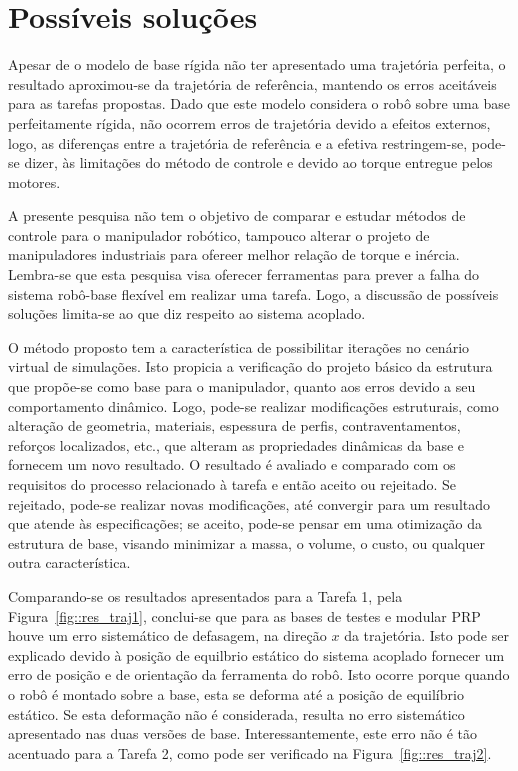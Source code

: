 \section{Possíveis soluções} \label{sec::solucoes}

Apesar de o modelo de base rígida não ter apresentado uma trajetória perfeita, o
resultado aproximou-se da trajetória de referência, mantendo os erros aceitáveis
para as tarefas propostas. Dado que este modelo considera o robô sobre uma base
perfeitamente rígida, não ocorrem erros de trajetória devido a efeitos externos,
logo, as diferenças entre a trajetória de referência e a efetiva restringem-se,
pode-se dizer, às limitações do método de controle e devido ao torque entregue
pelos motores.

A presente pesquisa não tem o objetivo de comparar e estudar métodos de controle
para o manipulador robótico, tampouco alterar o projeto de manipuladores
industriais para ofereer melhor relação de torque e inércia. Lembra-se que esta
pesquisa visa oferecer ferramentas para prever a falha do sistema robô-base
flexível em realizar uma tarefa. Logo, a discussão de possíveis soluções
limita-se ao que diz respeito ao sistema acoplado. 

O método proposto tem a característica de possibilitar iterações no cenário
virtual de simulações. Isto propicia a verificação do projeto básico da
estrutura que propõe-se como base para o manipulador, quanto aos erros devido a
seu comportamento dinâmico. Logo, pode-se realizar modificações estruturais,
como alteração de geometria, materiais, espessura de perfis, contraventamentos,
reforços localizados, etc., que alteram as propriedades dinâmicas da base e
fornecem um novo resultado. O resultado é avaliado e comparado com os requisitos
do processo relacionado à tarefa e então aceito ou rejeitado. Se rejeitado,
pode-se realizar novas modificações, até convergir para um resultado que atende
às especificações; se aceito, pode-se pensar em uma otimização da estrutura de
base, visando minimizar a massa, o volume, o custo, ou qualquer outra
característica.

Comparando-se os resultados apresentados para a Tarefa 1, pela
Figura~\ref{fig::res_traj1}, conclui-se que para as bases de testes e modular
PRP houve um erro sistemático de defasagem, na direção $x$ da trajetória. Isto
pode ser explicado devido à posição de equilbrio estático do sistema acoplado
fornecer um erro de posição e de orientação da ferramenta do robô. Isto ocorre
porque quando o robô é montado sobre a base, esta se deforma até a posição de
equilíbrio estático. Se esta deformação não é considerada, resulta no erro
sistemático apresentado nas duas versões de base. Interessantemente, este erro
não é tão acentuado para a Tarefa 2, como pode ser verificado na
Figura~\ref{fig::res_traj2}.

